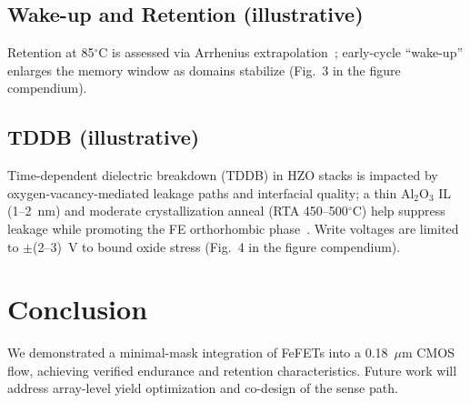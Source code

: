 \documentclass[conference]{IEEEtran}
\begin{document}
\subsection{Wake-up and Retention (illustrative)}
Retention at 85$^\circ$C is assessed via Arrhenius extrapolation~\cite{Yamazaki2018}; early-cycle “wake-up” enlarges the memory window as domains stabilize (Fig.~3 in the figure compendium).

\subsection{TDDB (illustrative)}
Time-dependent dielectric breakdown (TDDB) in HZO stacks is impacted by oxygen-vacancy-mediated leakage paths and interfacial quality; a thin Al$_2$O$_3$ IL (1--2~nm) and moderate crystallization anneal (RTA 450--500$^\circ$C) help suppress leakage while promoting the FE orthorhombic phase~\cite{Mueller2015,Park2020}. Write voltages are limited to $\pm$(2--3)~V to bound oxide stress (Fig.~4 in the figure compendium).

\section{Conclusion}
We demonstrated a minimal-mask integration of FeFETs into a 0.18~$\mu$m CMOS flow, achieving verified endurance and retention characteristics. Future work will address array-level yield optimization and co-design of the sense path.
\end{document}
